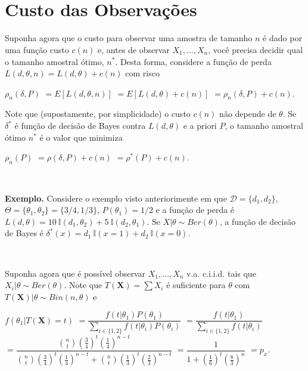 \documentclass[
]{book}
\begin{document}
\(~\)

\(~\)

\hypertarget{custo-das-observauxe7uxf5es}{%
\section{Custo das Observações}\label{custo-das-observauxe7uxf5es}}

Suponha agora que o custo para observar uma amostra de tamanho \(n\) é dado por uma função custo \(c(n)\) e, antes de observar \(X_1,\ldots,X_n\), você precisa decidir qual o tamanho amostral ótimo, \(n^*\). Desta forma, considere a função de perda \(L(d,\theta,n) = L(d,\theta) + c(n)\) com risco

\(\rho_n(\delta,P)\) \(= E\left[L(d,\theta,n)\right]\) \(= E\left[L(d,\theta) + c(n)\right]\) \(= \rho_n(\delta,P) + c(n)\).

Note que (supostamente, por simplicidade) o custo \(c(n)\) não depende de \(\theta\). Se \(\delta^*\) é função de decisão de Bayes contra \(L(d,\theta)\) e a priori \(P\), o tamanho amostral ótimo \(n^*\) é o valor que minimiza

\(\rho_n(P)\) \(= \rho(\delta,P) + c(n)\) \(= \rho^*(P) + c(n)\).

\(~\)

\textbf{Exemplo.} Considere o exemplo visto anteriorimente em que \(\mathcal{D}=\{d_1,d_2\}\), \(\Theta=\{\theta_1,\theta_2\}=\{3/4,1/3\}\), \(P(\theta_1)=1/2\) e a função de perda é \(L(d,\theta)=10~\mathbb{I}(d_1,\theta_2) + 5~\mathbb{I}(d_2,\theta_1)\). Se \(X|\theta \sim Ber(\theta)\), a função de decisão de Bayes é \(\delta^*(x)=d_1~\mathbb{I}(x=1)+d_2~\mathbb{I}(x=0)\).

\(~\)

Suponha agora que é possível observar \(X_1,\ldots,X_n\) v.a. c.i.i.d. tais que \(X_i|\theta \sim Ber(\theta)\). Note que \(T(\boldsymbol X)=\sum X_i\) é suficiente para \(\theta\) com \(T(\boldsymbol X)|\theta \sim Bin(n,\theta)\) e

\(f(\theta_1|T(\boldsymbol X)=t)\)
\(=\dfrac{f(t|\theta_1)P(\theta_1)}{\displaystyle \sum_{i\in\{1,2\}} f(t|\theta_i)P(\theta_i)}\)
\(=\dfrac{f(t|\theta_1)}{\displaystyle \sum_{i\in\{1,2\}} f(t|\theta_i)}\)
\(=\dfrac{\binom{n}{t}\left(\frac{3}{4}\right)^t\left(\frac{1}{4}\right)^{n-t}}{\binom{n}{t}\left(\frac{3}{4}\right)^t\left(\frac{1}{4}\right)^{n-t}+\binom{n}{t}\left(\frac{1}{3}\right)^t\left(\frac{2}{3}\right)^{n-t}}\)
\(=\dfrac{1}{1+\left(\frac{1}{6}\right)^t\left(\frac{8}{3}\right)^{n}}\) \(=p_x\).
\end{document}
